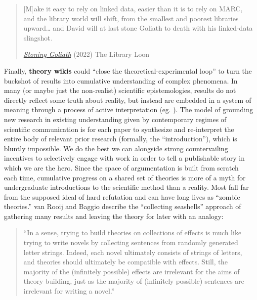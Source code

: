 \begin{quote}
{[}M{]}ake it easy to rely on linked data, easier than it is to rely on
MARC, and the library world will shift, from the smallest and poorest
libraries upward\ldots{} and David will at last stone Goliath to death
with his linked-data slingshot.

\href{https://gavialib.com/2022/06/stoning-goliath/}{\emph{Stoning
Goliath}} (2022) The Library Loon \citep{librariaStoningGoliath2022} 
\end{quote}

Finally, \textbf{theory wikis} could ``close the
theoretical-experimental loop'' to turn the buckshot of results into
cumulative understanding of complex phenomena. In many (or maybe just
the non-realist) scientific epistemologies, results do not directly
reflect some truth about reality, but instead are embedded in a system
of meaning through a process of active interpretation (eg. \citep{meehlTheoreticalRisksTabular1978, cartwrightHowLawsPhysics1983a} ).
The model of grounding new research in existing understanding given by
contemporary regimes of scientific communication is for each paper to
synthesize and re-interpret the entire body of relevant prior research
(formally, the ``introduction''), which is bluntly impossible. We do the
best we can alongside strong countervailing incentives to selectively
engage with work in order to tell a publishable story in which we are
the hero. Since the space of argumentation is built from scratch each
time, cumulative progress on a shared set of theories is more of a myth
for undergraduate introductions to the scientific method than a reality.
Most fall far from the supposed ideal of hard refutation and can have
long lives as ``zombie theories.'' van Rooij and Baggio describe the
``collecting seashells'' approach of gathering many results and leaving
the theory for later with an analogy:

\begin{quote}
``In a sense, trying to build theories on collections of effects is much
like trying to write novels by collecting sentences from randomly
generated letter strings. Indeed, each novel ultimately consists of
strings of letters, and theories should ultimately be compatible with
effects. Still, the majority of the (infinitely possible) effects are
irrelevant for the aims of theory building, just as the majority of
(infinitely possible) sentences are irrelevant for writing a novel.''
\citep{vanrooijTheoryTestHow2021} 
\end{quote}

